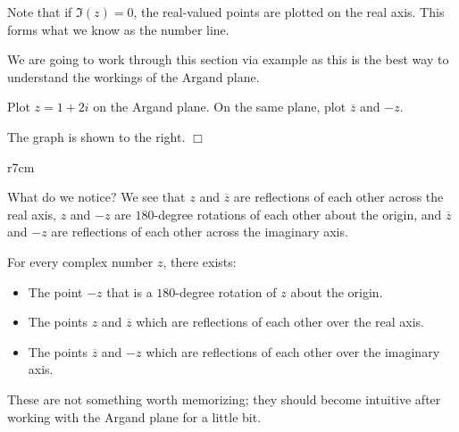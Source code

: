 \documentclass[../book.tex]{subfiles}
\begin{document}
Note that if $\Im(z)=0$, the real-valued points are plotted on the real axis.  This forms what we know as the number line.

We are going to work through this section via example as this is the best way to understand the workings of the Argand plane.
\begin{example}
Plot $z=1+2i$ on the Argand plane.  On the same plane, plot $\overline{z}$ and $-z$.
\end{example}
\begin{solution}
The graph is shown to the right.  $\Box$
\end{solution}
\begin{wrapfigure}{r}{7cm}
    \centering
{}
\end{wrapfigure}
\noindent What do we notice? We see that $z$ and $\overline{z}$ are reflections of each other across the real axis, $z$ and $-z$ are $180$-degree rotations of each other about the origin, and $\overline{z}$ and $-z$ are reflections of each other across the imaginary axis.  
\begin{note}
For every complex number $z$, there exists:
\begin{itemize}
    \item The point $-z$ that is a $180$-degree rotation of $z$ about the origin.
    \item The points $z$ and $\overline{z}$ which are reflections of each other over the real axis.
    \item The points $\overline{z}$ and $-z$ which are reflections of each other over the imaginary axis.
\end{itemize}
\end{note}
\noindent These are not something worth memorizing; they should become intuitive after working with the Argand plane for a little bit.
\end{document}
